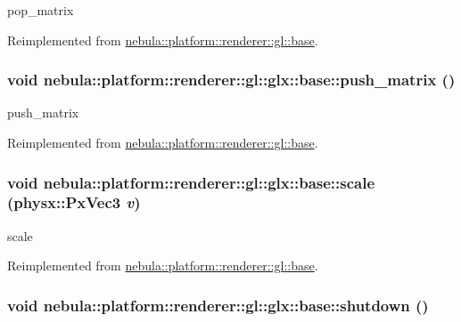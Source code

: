 pop\_\-matrix 

Reimplemented from \hyperlink{classnebula_1_1platform_1_1renderer_1_1gl_1_1base_a090d8f0a4b385b23d1576c43ea27e22e}{nebula::platform::renderer::gl::base}.\hypertarget{classnebula_1_1platform_1_1renderer_1_1gl_1_1glx_1_1base_a2bf526a5a2f23318008cd1fa40a68d52}{
\subsubsection[{push\_\-matrix}]{\setlength{\rightskip}{0pt plus 5cm}void nebula::platform::renderer::gl::glx::base::push\_\-matrix ()}}
\label{classnebula_1_1platform_1_1renderer_1_1gl_1_1glx_1_1base_a2bf526a5a2f23318008cd1fa40a68d52}


push\_\-matrix 

Reimplemented from \hyperlink{classnebula_1_1platform_1_1renderer_1_1gl_1_1base_add015b34e9567bfaca68a94c0cb76b06}{nebula::platform::renderer::gl::base}.\hypertarget{classnebula_1_1platform_1_1renderer_1_1gl_1_1glx_1_1base_a2d51799c14c9f17a8e5eb0900a02714d}{
\subsubsection[{scale}]{\setlength{\rightskip}{0pt plus 5cm}void nebula::platform::renderer::gl::glx::base::scale (physx::PxVec3 {\em v})}}
\label{classnebula_1_1platform_1_1renderer_1_1gl_1_1glx_1_1base_a2d51799c14c9f17a8e5eb0900a02714d}


scale 

Reimplemented from \hyperlink{classnebula_1_1platform_1_1renderer_1_1gl_1_1base_aa2cb1371b6b66b24b1d9bc8b8bbe1f90}{nebula::platform::renderer::gl::base}.\hypertarget{classnebula_1_1platform_1_1renderer_1_1gl_1_1glx_1_1base_ac6647cc66f798bbf9d500b8f4254cd94}{
\subsubsection[{shutdown}]{\setlength{\rightskip}{0pt plus 5cm}void nebula::platform::renderer::gl::glx::base::shutdown ()}}
\label{classnebula_1_1platform_1_1renderer_1_1gl_1_1glx_1_1base_ac6647cc66f798bbf9d500b8f4254cd94}


